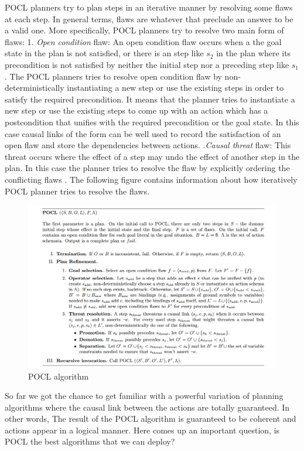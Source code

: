 \documentclass[english]{tktltiki}
\begin{document}
POCL planners try to plan steps in an iterative manner by resolving some flaws at each step. In general terms, flaws are whatever that preclude an answer to be a valid one. More specifically, POCL planners try to resolve two main form of  flaws:
1. \textit{Open condition} flaw: An open condition flaw occurs when a the goal state in the plan is not satisfied, or there is an step like $s_2$ in the plan where its precondition is not satisfied by neither the initial step nor a preceding step like $s_1$. The POCL planners tries to resolve open condition flaw by non-deterministically instantiating a new step or use the existing steps in order to satisfy the required precondition. It means that the planner tries to instantiate a new step or use the existing steps to come up with an action which has a postcondition that unifies with the required precondition or the goal state. In this case causal links of the form can be well used to record the satisfaction of an open flaw and store the dependencies between actions. .\textit{Causal threat} flaw: This threat occurs where the effect of a step may undo the effect of another step in the plan. In this case the planner tries to resolve the flaw by explicitly ordering the conflicting flaws \cite{narrativeconflict}.
The following figure contains information about how iteratively POCL planner tries to resolve the flaws.
\begin{figure}[h!]
\centering
	\includegraphics[width=1\textwidth]{POCL}
\caption{POCL algorithm}
\end{figure}
So far we got the chance to get familiar with a powerful variation of planning algorithms where the causal link between the actions are totally guaranteed. In other words, The result of the POCL algorithm is guaranteed to be coherent and actions appear in a logical manner. Here comes up an important question, is POCL the best algorithms that we can deploy?\newline
\end{document}
